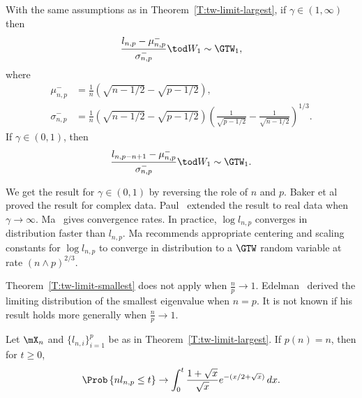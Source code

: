 \begin{theorem}\label{T:tw-limit-smallest}
    With the same assumptions as in Theorem~\ref{T:tw-limit-largest}, if
    $\gamma \in (1,\infty)$ then
    \[
        \frac{l_{n,p} - \mu_{n,p}^-}{\sigma_{n,p}^-}
        \tod
        W_1
        \sim
        \GTW_1,
    \]
    where
    \begin{align*}
        \mu_{n,p}^-
            &=
            \frac{1}{n}
            \left(
                \sqrt{n - 1/2}
                -
                \sqrt{p - 1/2}
            \right), \\
        \sigma_{n,p}^-
            &= 
            \frac{1}{n}
            \left(
                \sqrt{n - 1/2}
                -
                \sqrt{p - 1/2}
            \right)
            \left(
                \frac{1}{\sqrt{p - 1/2}}
                -
                \frac{1}{\sqrt{n - 1/2}}
            \right)^{1/3}.
    \end{align*}
    If $\gamma \in (0, 1)$, then
    \[
        \frac{l_{n,p-n+1} - \mu_{n,p}^-}{\sigma_{n,p}^-}
        \tod
        W_1
        \sim
        \GTW_1.
    \]
\end{theorem}

\noindent
We get the result for $\gamma \in (0,1)$ by reversing the role of $n$ and $p$.
Baker et al~\cite{baker1998rme} proved the result for complex data.
Paul~\cite{paul2006dse} extended the result to real data when $\gamma \to \infty$.  Ma~\cite{ma2008atw} gives convergence rates.  In practice,
$\log l_{n,p}$ converges in distribution faster than $l_{n,p}$.  Ma recommends appropriate centering and scaling constants for $\log l_{n,p}$ to converge in distribution to a $\GTW$ random variable at rate $(n \wedge p)^{2/3}$.

Theorem~\ref{T:tw-limit-smallest} does not apply when $\frac{n}{p} \to 1$.  Edelman~\cite{edelman1988ecn} derived the limiting distribution of the smallest eigenvalue when $n = p$.  It is not known if his result holds more generally when $\frac{n}{p} \to 1$.

\begin{theorem}\label{T:edelman-limit-smallest}
    Let $\mX_n$ and $\{ l_{n,i} \}_{i=1}^p$ be as in 
    Theorem~\ref{T:tw-limit-largest}.  If $p(n) = n$, then for $t \geq 0$,
    \[
        \Prob\left\{
            n l_{n,p} \leq t
        \right\}
        \to
        \int_0^t
            \frac{1 + \sqrt{x}}{\sqrt{x}}
            e^{-(x/2 + \sqrt{x})}
            \,
            dx.
    \]
\end{theorem}

